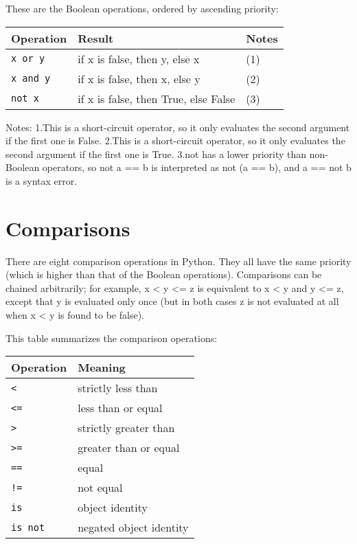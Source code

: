 These are the Boolean operations, ordered by ascending priority:



\begin{table}[ht]
	\centering
	\begin{tabular}{|l|l|l|}
		\hline
		Operation & Result & Notes\\
		\hline
		\verb|x or y| & if x is false, then y, else x &  (1) \\
		\verb|x and y| & if x is false, then x, else y & (2)  \\
		\verb|not x| & if x is false, then True, else False & (3)  \\								
		\hline
	\end{tabular}
\end{table}


  

Notes:
1.This is a short-circuit operator, so it only evaluates the second argument if the first one is False.
2.This is a short-circuit operator, so it only evaluates the second argument if the first one is True.
3.not has a lower priority than non-Boolean operators, so not a == b is interpreted as not (a == b), and a == not b is a syntax error.

\section{Comparisons}

There are eight comparison operations in Python. They all have the same priority (which is higher than that of the Boolean operations). Comparisons can be chained arbitrarily; for example, x < y <= z is equivalent to x < y and y <= z, except that y is evaluated only once (but in both cases z is not evaluated at all when x < y is found to be false).

This table summarizes the comparison operations:


\begin{table}[ht]
	\centering
	\begin{tabular}{|l|l|}
		\hline
		Operation & Meaning \\
		\hline
		\verb|<| & strictly less than \\
		\verb|<=| & less than or equal  \\							
		\verb|>| & strictly greater than \\
		\verb|>=| & greater than or equal  \\							
		\verb|==| & equal \\
		\verb|!=| & not equal  \\							
		\verb|is| & object identity \\
		\verb|is not| & negated object identity  \\							
		\hline
	\end{tabular}
\end{table}



